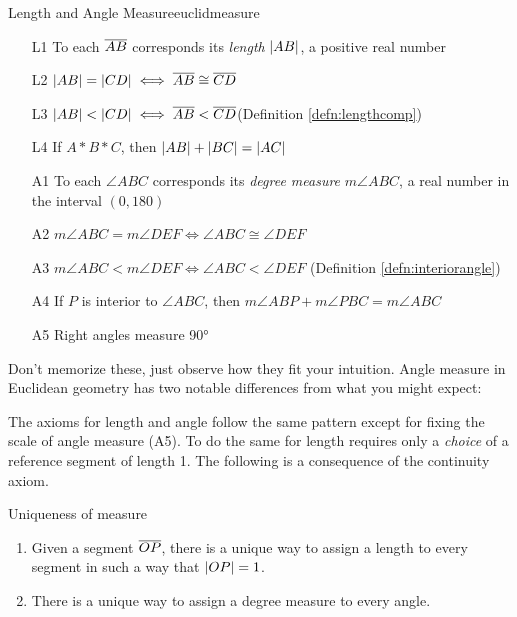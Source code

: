\begin{axioms}{Length and Angle Measure}{euclidmeasure}
\begin{itemize}%
		\item[L1] To each $\overline{AB}$ corresponds its \emph{length} $\left| AB\right|$, a positive real number
		\item[L2] $\left| AB\right|=\left| CD\right|\iff \overline{AB}\cong\overline{CD}$
		\item[L3] $\left| AB\right|<\left| CD\right|\iff\overline{AB}<\overline{CD}$\hfill (Definition \ref{defn:lengthcomp})
		\item[L4] If $A*B*C$, then $\left| AB\right|+\left| BC\right|=\left| AC\right|$
		\item[A1] To each $\angle ABC$ corresponds its \emph{degree measure} $m\angle ABC$, a real number in the interval $(0,180)$
		\item[A2] $m\angle ABC=m\angle DEF\iff \angle ABC\cong\angle DEF$
		\item[A3] $m\angle ABC<m\angle DEF\iff \angle ABC<\angle DEF$ \hfill (Definition \ref{defn:interiorangle})
  	\item[A4] If $P$ is interior to $\angle ABC$, then $m\angle ABP+m\angle PBC=m\angle ABC$
  	\item[A5] Right angles measure \ang{90}
	\end{itemize}
\end{axioms}

Don't memorize these, just observe how they fit your intuition. Angle measure in Euclidean geometry has two notable differences from what you might expect:
The axioms for length and angle follow the same pattern except for fixing the scale of angle measure (A5). To do the same for length requires only a \emph{choice} of a reference segment of length 1. The following is a consequence of the continuity axiom.

\begin{thm}{Uniqueness of measure}{}
\begin{enumerate}
  \item Given a segment $\overline{OP}$, there is a unique way to assign a length to every segment in such a way that $\left| OP\right|=1$.
  \item There is a unique way to assign a degree measure to every angle.
\end{enumerate}
\end{thm}

